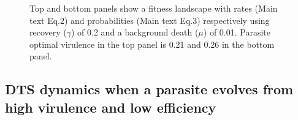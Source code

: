 \documentclass{article}
\begin{document}
\begin{figure}[H]
\caption{Top and bottom panels show a fitness landscape with rates (Main text Eq.2) and probabilities (Main text Eq.3) respectively using recovery ($\gamma$) of 0.2 and a background death ($\mu$) of 0.01. Parasite optimal virulence in the top panel is 0.21 and 0.26 in the bottom panel.} 
\label{fig:surface_comparison}
\end{figure} 
\clearpage

\subsection*{DTS dynamics when a parasite evolves from high virulence and low efficiency}
\end{document}
